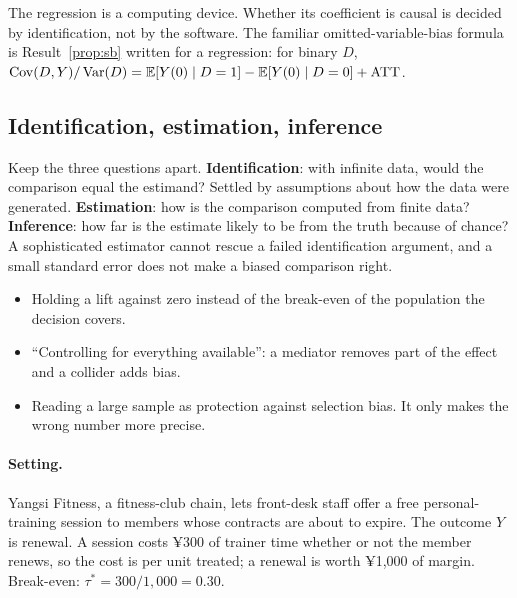 \documentclass[11pt]{article}
\begin{document}
The regression is a computing device. Whether its coefficient is causal is decided by identification, not
by the software. The familiar omitted-variable-bias formula is Result~\ref{prop:sb} written for a regression: for binary
$D$, $\operatorname{Cov}(D,Y)/\operatorname{Var}(D) = \mathbb{E}[Y(0) \mid D=1] - \mathbb{E}[Y(0) \mid D=0] + \text{ATT}$.

\subsection{Identification, estimation, inference}

Keep the three questions apart. \textbf{Identification}: with infinite data, would the comparison equal
the estimand? Settled by assumptions about how the data were generated. \textbf{Estimation}: how is the
comparison computed from finite data? \textbf{Inference}: how far is the estimate likely to be from the
truth because of chance? A sophisticated estimator cannot rescue a failed identification argument, and a
small standard error does not make a biased comparison right.

\begin{pitfall}
\begin{itemize}[leftmargin=1.2em]
  \item Holding a lift against zero instead of the break-even of the population the decision covers.
  \item ``Controlling for everything available'': a mediator removes part of the effect and a collider
  adds bias.
  \item Reading a large sample as protection against selection bias. It only makes the wrong number more
  precise.
\end{itemize}
\end{pitfall}


\sectiontwo

\paragraph{Setting.} Yangsi Fitness, a fitness-club chain, lets front-desk staff offer a free personal-training
session to members whose contracts are about to expire. The outcome $Y$ is renewal. A session costs ¥300
of trainer time whether or not the member renews, so the cost is per unit treated; a renewal is worth ¥1{,}000
of margin. Break-even: $\tau^\ast = 300/1{,}000 = 0.30$.
\end{document}
